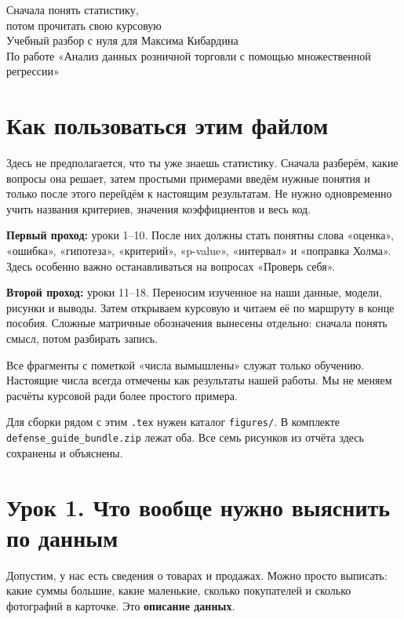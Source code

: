 \documentclass[12pt,a4paper]{article}
\begin{document}
\renewcommand{\contentsname}{Содержание}
\begin{center}
{\LARGE Сначала понять статистику,\\потом прочитать свою курсовую}\\[10pt]
{\large Учебный разбор с нуля для Максима Кибардина}\\[8pt]
По работе «Анализ данных розничной торговли с помощью множественной регрессии»
\end{center}

\section*{Как пользоваться этим файлом}

Здесь не предполагается, что ты уже знаешь статистику. Сначала разберём, какие вопросы она решает, затем простыми примерами введём нужные понятия и только после этого перейдём к настоящим результатам. Не нужно одновременно учить названия критериев, значения коэффициентов и весь код.

\textbf{Первый проход:} уроки 1--10. После них должны стать понятны слова «оценка», «ошибка», «гипотеза», «критерий», «p-value», «интервал» и «поправка Холма». Здесь особенно важно останавливаться на вопросах «Проверь себя».

\textbf{Второй проход:} уроки 11--18. Переносим изученное на наши данные, модели, рисунки и выводы. Затем открываем курсовую и читаем её по маршруту в конце пособия. Сложные матричные обозначения вынесены отдельно: сначала понять смысл, потом разбирать запись.

Все фрагменты с пометкой «числа вымышлены» служат только обучению. Настоящие числа всегда отмечены как результаты нашей работы. Мы не меняем расчёты курсовой ради более простого примера.

Для сборки рядом с этим \texttt{.tex} нужен каталог \texttt{figures/}. В комплекте \texttt{defense\_guide\_bundle.zip} лежат оба. Все семь рисунков из отчёта здесь сохранены и объяснены.

\tableofcontents
\clearpage
\section{Урок 1. Что вообще нужно выяснить по данным}

Допустим, у нас есть сведения о товарах и продажах. Можно просто выписать: какие суммы большие, какие маленькие, сколько покупателей и сколько фотографий в карточке. Это \textbf{описание данных}.
\end{document}
